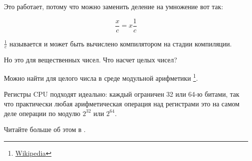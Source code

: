 Это работает, потому что можно заменить деление на умножение вот так:

\[
	\frac{x}{c} = x\frac{1}{c}
\]


$\frac{1}{c}$ называется  и может быть вычислено компилятором на стадии компиляции.

Но это для вещественных чисел.
Что насчет целых чисел?

Можно найти  для целого числа в среде модульной арифметики
\footnote{\href{http://go.yurichev.com/17359}{Wikipedia}}.

Регистры \ac{CPU} подходят идеально: каждый ограничен 32 или 64-ю битами, так что практически любая арифметическая операция над регистрами это на самом деле операции по модулю $2^{32}$ или $2^{64}$.

Читайте больше об этом в .
